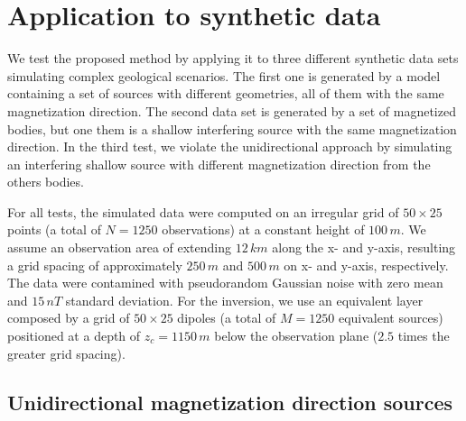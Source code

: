 \section{Application to synthetic data}
\label{sec:synt_tests}

We test the proposed method by applying it to three different synthetic data sets simulating complex geological scenarios. The first one is generated by a model containing a set of sources with different geometries, all of them with the same magnetization direction. The second data set is generated by a set of magnetized bodies, but one them is a shallow interfering source with the same magnetization direction. In the third test, we violate the unidirectional approach by simulating an interfering shallow source with different magnetization direction from the others bodies.

For all tests, the simulated data were computed on an irregular grid of $50 \times 25$ points (a total of $N = 1250$ observations) at a constant height of $100 \, m$.  We assume an observation area of extending $12 \, km$ along the x- and y-axis, resulting a grid spacing of approximately $250 \, m$ and $500 \, m$ on x- and y-axis, respectively. The data were contamined with pseudorandom Gaussian noise with zero mean and $15 \, nT$ standard deviation. For the inversion, we use an equivalent layer composed by a grid of $50 \times 25$ dipoles (a total of $M = 1250$ equivalent sources) positioned at a depth of $z_c = 1150 \, m$ below the observation plane ($2.5$ times the greater grid spacing). 

\subsection{Unidirectional magnetization direction sources}
 



